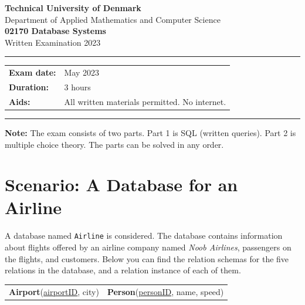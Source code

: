 \documentclass[12pt,a4paper]{article}
\begin{document}
\begin{center}
  \vspace*{1cm}
  {\large \textbf{Technical University of Denmark}}\\[0.3em]
  Department of Applied Mathematics and Computer Science\\[1.5em]
  {\LARGE \textbf{02170 Database Systems}}\\[0.5em]
  {\Large Written Examination 2023}\\[1em]
  \hrule
  \vspace{0.5em}
  \begin{tabular}{ll}
    \textbf{Exam date:}     & May 2023 \\
    \textbf{Duration:}      & 3 hours \\
    \textbf{Aids:}          & All written materials permitted. No internet. \\
  \end{tabular}
  \vspace{0.5em}
  \hrule
\end{center}

\vspace{1em}
\noindent\textbf{Note:} The exam consists of two parts. Part 1 is SQL (written queries). Part 2 is multiple choice theory. The parts can be solved in any order.

\newpage

\section*{Scenario: A Database for an Airline}

A database named \texttt{Airline} is considered. The database contains information about flights offered by an airline company named \textit{Noob Airlines}, passengers on the flights, and customers. Below you can find the relation schemas for the five relations in the database, and a relation instance of each of them.

\vspace{0.5em}
\begin{tabular}{ll}
\textbf{Airport}(\underline{airportID}, city) &
\textbf{Person}(\underline{personID}, name, speed) \\
\end{tabular}
\end{document}
